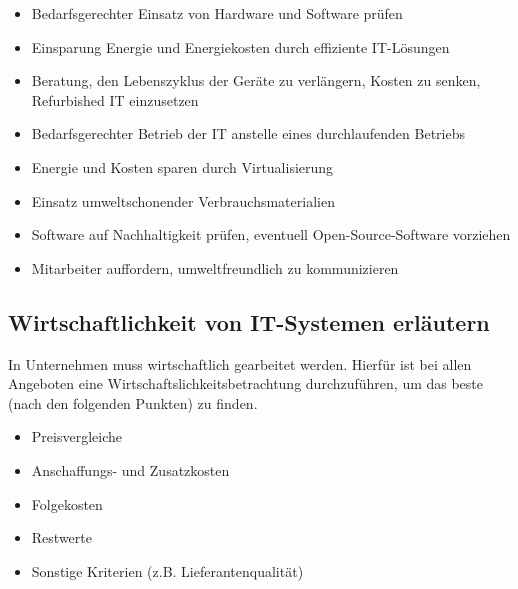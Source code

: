     \begin{tcolorbox}[width=14cm, center, title=Maßnahmenkatalog Green-IT, coltitle=white, colframe=orange, colback=white!60!orange]
        \begin{itemize}[itemsep=0.1em, parsep=0.3em]
            \item Bedarfsgerechter Einsatz von Hardware und Software prüfen
            \item Einsparung Energie und Energiekosten durch effiziente IT-Lösungen
            \item Beratung, den Lebenszyklus der Geräte zu verlängern, Kosten zu senken, Refurbished IT einzusetzen
            \item Bedarfsgerechter Betrieb der IT anstelle eines durchlaufenden Betriebs
            \item Energie und Kosten sparen durch Virtualisierung
            \item Einsatz umweltschonender Verbrauchsmaterialien
            \item Software auf Nachhaltigkeit prüfen, eventuell Open-Source-Software vorziehen
            \item Mitarbeiter auffordern, umweltfreundlich zu kommunizieren
        \end{itemize}
    \end{tcolorbox}

\subsection{Wirtschaftlichkeit von IT-Systemen erläutern}
    \begin{subindent}
        In Unternehmen muss wirtschaftlich gearbeitet werden. Hierfür ist bei allen Angeboten eine Wirtschaftslichkeitsbetrachtung durchzuführen, um das beste (nach den folgenden Punkten) zu finden.
    \end{subindent}

    \begin{tcolorbox}[width=11cm, center, title=Wirtschaftlichkeitsbetrachtungskriterien, coltitle=white, colframe=white!20!blue, colback=white!80!blue]
        \begin{itemize}[itemsep=0.01em, parsep=0.3em]
            \item Preisvergleiche
            \item Anschaffungs- und Zusatzkosten
            \item Folgekosten
            \item Restwerte
            \item Sonstige Kriterien (z.B. Lieferantenqualität)
        \end{itemize}
    \end{tcolorbox}

